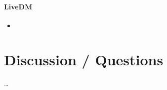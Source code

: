 \documentclass{i20lecture}
\begin{document}
\begin{frame}{\insertsection}
  \framesubtitle{LiveDM}
  
  \begin{itemize}
    \item 
  \end{itemize}
\end{frame}


\section{Discussion / Questions}
\begin{frame}{\insertsection}
  \begin{center}
    \LARGE \dots
  \end{center}
\end{frame}
\end{document}
